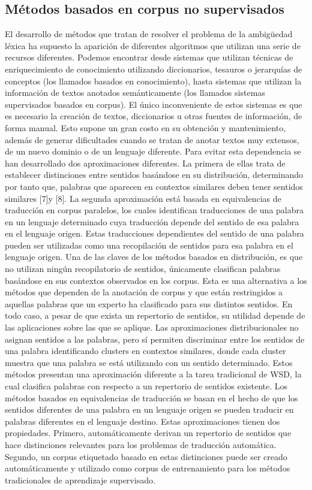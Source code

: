\subsection{Métodos basados en corpus no supervisados}
El desarrollo de métodos que tratan de resolver el problema de la ambigüedad léxica ha supuesto la aparición de diferentes algoritmos que utilizan una serie de recursos diferentes. Podemos encontrar desde sistemas que utilizan técnicas de enriquecimiento de conocimiento utilizando diccionarios, tesauros o jerarquías de conceptos (los llamados basados en conocimiento), hasta sistemas que utilizan la información de textos anotados semánticamente (los llamados sistemas supervisados basados en corpus). El único inconveniente de estos sistemas es que es necesario la creación de textos, diccionarios u otras fuentes de información, de forma manual.
Esto supone un gran costo en su obtención y mantenimiento, además de generar dificultades cuando se tratan de anotar textos muy extensos, de un nuevo dominio o de un lenguaje diferente. Para evitar esta dependencia se han desarrollado dos aproximaciones diferentes. La primera de ellas trata de establecer distinciones entre sentidos basándose en su distribución, determinando por tanto que, palabras que aparecen en contextos similares deben tener sentidos similares [7]y [8]. La segunda aproximación está basada en equivalencias de traducción en corpus paralelos, los cuales identifican traducciones de una palabra en un lenguaje determinado cuya traducción depende del sentido de esa palabra en el lenguaje origen. Estas traducciones dependientes del sentido de una palabra pueden ser utilizadas como una recopilación de sentidos para esa palabra en el lenguaje origen.
Una de las claves de los métodos basados en distribución, es que no utilizan ningún recopilatorio de sentidos, únicamente clasifican palabras basándose en sus contextos observados en los corpus. Esta es una alternativa a los métodos que dependen de la anotación de corpus y que están restringidos a aquellas palabras que un experto ha clasificado para sus distintos sentidos. En todo caso, a pesar de que exista un repertorio de sentidos, su utilidad depende de las aplicaciones sobre las que se aplique. Las aproximaciones distribucionales no asignan sentidos a las palabras, pero sí permiten discriminar entre los sentidos de una palabra identificando clusters en contextos similares, donde cada cluster muestra que una palabra se está utilizando con un sentido determinado. Estos métodos presentan una aproximación diferente a la tarea tradicional de WSD, la cual clasifica palabras con respecto a un repertorio de sentidos existente. Los métodos basados en equivalencias de traducción se basan en el hecho de que los sentidos diferentes de una palabra en un lenguaje origen se pueden traducir en palabras diferentes en el lenguaje destino. Estas aproximaciones tienen dos propiedades. Primero, automáticamente derivan un repertorio de sentidos que hace distinciones relevantes para los problemas de traducción automática. Segundo, un corpus etiquetado basado en estas distinciones puede ser creado automáticamente y utilizado como corpus de entrenamiento para los métodos tradicionales de aprendizaje supervisado.
